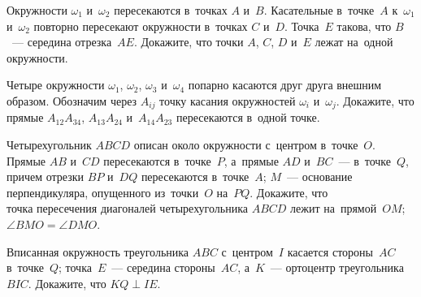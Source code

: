\begin{problems}
\item
Окружности $\omega_{1}$ и~$\omega_{2}$ пересекаются в~точках $A$ и~$B$.
Касательные в~точке~$A$ к~$\omega_{1}$ и~$\omega_{2}$ повторно пересекают
окружности в~точках $C$ и~$D$.
Точка~$E$ такова, что $B$~--- середина отрезка~$AE$.
Докажите, что точки $A$, $C$, $D$ и~$E$ лежат на~одной окружности.

\item
Четыре окружности $\omega_{1}$, $\omega_{2}$, $\omega_{3}$ и~$\omega_{4}$
попарно касаются друг друга внешним образом.
Обозначим через $A_{ij}$ точку касания окружностей $\omega_{i}$ и~$\omega_{j}$.
Докажите, что прямые $A_{12}A_{34}$, $A_{13}A_{24}$ и~$A_{14}A_{23}$
пересекаются в~одной точке.

\item
Четырехугольник $ABCD$ описан около окружности с~центром в~точке~$O$.
Прямые $AB$ и~$CD$ пересекаются в~точке~$P$, а~прямые $AD$ и~$BC$~---
в~точке~$Q$, причем отрезки $BP$ и~$DQ$ пересекаются в~точке~$A$;
$M$~--- основание перпендикуляра, опущенного из~точки~$O$ на~$PQ$.
Докажите, что
\\
\subproblem
точка пересечения диагоналей четырехугольника $ABCD$ лежит на~прямой~$OM$;
\\
\subproblem
$\angle BMO = \angle DMO$.

\item
Вписанная окружность треугольника $ABC$ с~центром~$I$ касается стороны~$AC$
в~точке~$Q$;
точка~$E$~--- середина стороны~$AC$, а~$K$~--- ортоцентр треугольника $BIC$.
Докажите, что $KQ \perp IE$.

\end{problems}

